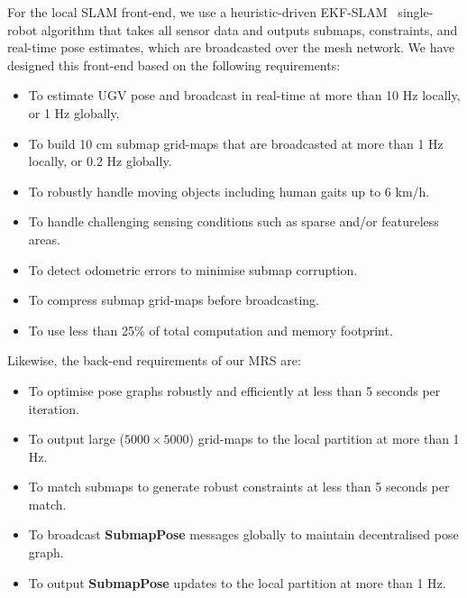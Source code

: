 For the local SLAM front-end, we use a heuristic-driven EKF-SLAM~\cite{dissanayake_solution_2001} single-robot algorithm that takes all sensor data and outputs submaps, constraints, and real-time pose estimates, which are broadcasted over the mesh network. We have designed this front-end based on the following requirements:
\begin{itemize}
	\item To estimate UGV pose and broadcast in real-time at more than 10 Hz locally, or 1 Hz globally.
	\item To build 10 cm submap grid-maps that are broadcasted at more than 1 Hz locally, or 0.2 Hz globally.
	\item To robustly handle moving objects including human gaits up to 6 km/h.
	\item To handle challenging sensing conditions such as sparse and/or featureless areas.
	\item To detect odometric errors to minimise submap corruption.
	\item To compress submap grid-maps before broadcasting.
	\item To use less than 25\% of total computation and memory footprint.
\end{itemize}
Likewise, the back-end requirements of our MRS are:
\begin{itemize}
	\item To optimise pose graphs robustly and efficiently at less than 5 seconds per iteration.
	\item To output large ($5000\times5000$) grid-maps to the local partition at more than 1 Hz.
	\item To match submaps to generate robust constraints at less than 5 seconds per match.
	\item To broadcast \textbf{SubmapPose} messages globally to maintain decentralised pose graph.
	\item To output \textbf{SubmapPose} updates to the local partition at more than 1 Hz.
\end{itemize}

